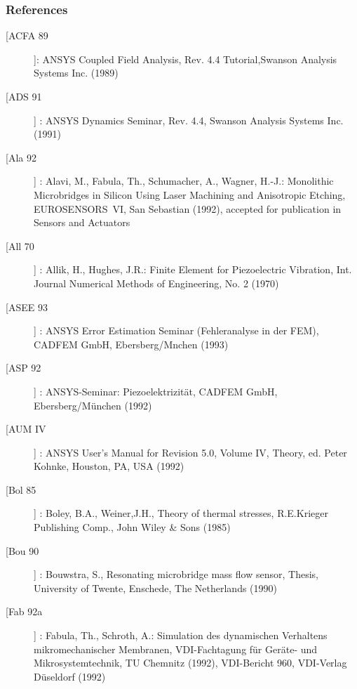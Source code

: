 \subsubsection{References}

\vspace*{0.5cm}

\begin{description}

\item[[ACFA 89]]: ANSYS Coupled Field Analysis, Rev. 4.4 Tutorial,Swanson Analysis Systems Inc. (1989)
\\
\item[[ADS 91]] : ANSYS Dynamics Seminar, Rev. 4.4, Swanson Analysis Systems Inc. (1991)
\\
\item[[Ala 92]] : Alavi, M., Fabula, Th., Schumacher, A., Wagner, H.-J.: Monolithic Microbridges in Silicon Using Laser Machining and Anisotropic Etching, \mbox{EUROSENSORS VI}, San Sebastian (1992), accepted for publication in Sensors and Actuators
\\
\item[[All 70]] : Allik, H., Hughes, J.R.: Finite Element for Piezoelectric Vibration, Int. Journal Numerical Methods of Engineering, No. 2 (1970)
 \\
\item[[ASEE 93]] : ANSYS Error Estimation Seminar (Fehleranalyse in der FEM), CADFEM GmbH, Ebersberg/Mnchen (1993)
\\
\item[[ASP 92]] : ANSYS-Seminar: Piezoelektrizität, CADFEM GmbH, Ebersberg/München (1992)
\\
\item[[AUM IV]] : ANSYS User's Manual for Revision 5.0, Volume IV, Theory, ed. Peter Kohnke, Houston, PA, USA (1992)
\\
\item[[Bol 85]] : Boley, B.A., Weiner,J.H., Theory of thermal stresses, R.E.Krieger Publishing Comp., John Wiley \& Sons (1985)
\\
\item[[Bou 90]] : Bouwstra, S., Resonating microbridge mass flow sensor, Thesis, University of Twente, Enschede, The Netherlands (1990)
\\
\item[[Fab 92a]] : Fabula, Th., Schroth, A.: Simulation des dynamischen Verhaltens mikromechanischer Membranen, VDI-Fachtagung für Geräte- und Mikrosystemtechnik, TU Chemnitz (1992), VDI-Bericht 960, VDI-Verlag Düseldorf (1992)

\end{description}
